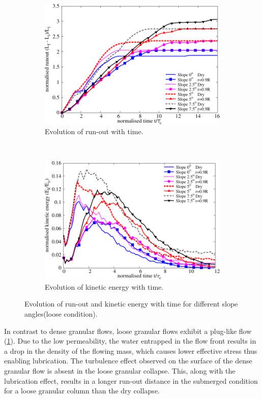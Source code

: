 \begin{figure}
\centering
\begin{subfigure}[b]{0.95\textwidth}
\centering
\includegraphics[width=0.97\columnwidth]{Runout_loose_slope}
\caption{Evolution of run-out with time.}
\label{fig:run_loose}
\end{subfigure} \\
\begin{subfigure}[b]{0.95\textwidth}
\centering
\includegraphics[width=0.97\columnwidth]{KE_loose_slope}
\caption{Evolution of kinetic energy with time.}
\label{fig:KE_loose}
\end{subfigure}
\caption{Evolution of run-out and kinetic energy with time for different slope 
angles(loose condition).}
\label{fig:KE_run_loose}
\end{figure}

In contrast to dense granular flows, loose granular flows exhibit a plug-like 
flow (\cref{fig:run_loose}). Due to the low permeability, the 
water entrapped in the flow front results in a drop in the density of the 
flowing mass, which causes lower effective stress thus enabling lubrication. 
The turbulence effect observed on the surface of the dense granular flow is 
absent in the loose granular collapse. This, along with the lubrication effect, 
results in a longer run-out distance in the submerged condition for a loose 
granular column than the dry collapse. 

